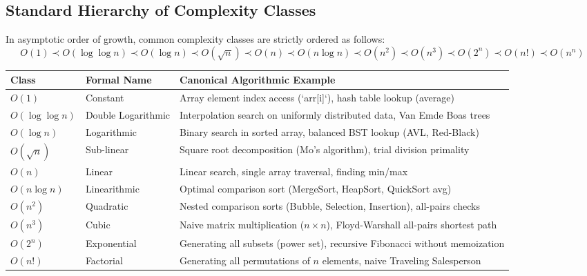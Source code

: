\documentclass[11pt,a4paper]{article}
\begin{document}
\subsection{Standard Hierarchy of Complexity Classes}
In asymptotic order of growth, common complexity classes are strictly ordered as follows:
\[
O(1) \prec O(\log \log n) \prec O(\log n) \prec O(\sqrt{n}) \prec O(n) \prec O(n \log n) \prec O(n^2) \prec O(n^3) \prec O(2^n) \prec O(n!) \prec O(n^n)
\]

\begin{center}
\begin{tabularx}{\textwidth}{l l p{6.5cm}}
\toprule
\textbf{Class} & \textbf{Formal Name} & \textbf{Canonical Algorithmic Example} \\
\midrule
$O(1)$ & Constant & Array element index access (`arr[i]`), hash table lookup (average) \\
$O(\log \log n)$ & Double Logarithmic & Interpolation search on uniformly distributed data, Van Emde Boas trees \\
$O(\log n)$ & Logarithmic & Binary search in sorted array, balanced BST lookup (AVL, Red-Black) \\
$O(\sqrt{n})$ & Sub-linear & Square root decomposition (Mo's algorithm), trial division primality \\
$O(n)$ & Linear & Linear search, single array traversal, finding min/max \\
$O(n \log n)$ & Linearithmic & Optimal comparison sort (MergeSort, HeapSort, QuickSort avg) \\
$O(n^2)$ & Quadratic & Nested comparison sorts (Bubble, Selection, Insertion), all-pairs checks \\
$O(n^3)$ & Cubic & Naive matrix multiplication ($n \times n$), Floyd-Warshall all-pairs shortest path \\
$O(2^n)$ & Exponential & Generating all subsets (power set), recursive Fibonacci without memoization \\
$O(n!)$ & Factorial & Generating all permutations of $n$ elements, naive Traveling Salesperson \\
\bottomrule
\end{tabularx}
\end{center}
\end{document}
